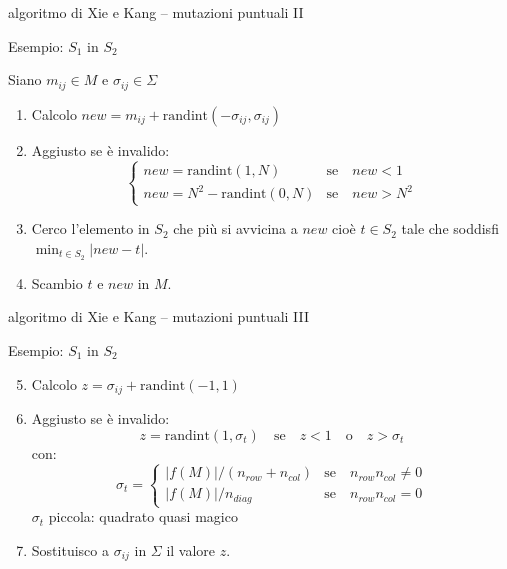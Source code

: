 \documentclass[10pt]{beamer}
\begin{document}
\begin{frame}{algoritmo di Xie e Kang -- mutazioni puntuali II}

    \begin{block}{Esempio: $ S_1 $ in $ S_2 $ }
    	\parbox{0.98\columnwidth}{
    		Siano $ m_{ij} \in M $ e $ \sigma_{ij} \in \Sigma $
    		\begin{enumerate}
    			\item Calcolo $ new =  m_{ij}   + \text{randint}(-\sigma_{ij}, \sigma_{ij})  $
    			\item Aggiusto se è invalido:
    			\[
    			\begin{cases}
    			new = \text{randint}(1,N) & \text{se} \quad new < 1  \\
    			new = N^2 - \text{randint}(0,N) & \text{se} \quad new > N^2  
    			\end{cases}
    			\]
    			\item Cerco l'elemento in $ S_2 $ che più si avvicina a $ new $ cioè $ t \in  S_2  $ tale che soddisfi $ \min_{t \in S_2} \lvert new - t \rvert $.
    			\item Scambio $ t $ e $ new $ in $ M $.	
    		\end{enumerate}
    	}
    \end{block} 
\end{frame}

\begin{frame}{algoritmo di Xie e Kang -- mutazioni puntuali III}
	
	\begin{block}{Esempio: $ S_1 $ in $ S_2 $ }
		\parbox{0.98\columnwidth}{
			\begin{enumerate}
				\setcounter{enumi}{4}
				\item Calcolo $ z =  \sigma_{ij}   + \text{randint}(-1,1)  $
				\item Aggiusto se è invalido:
\[
z = \text{randint}(1,\sigma_t) \quad \text{se} \quad z < 1 \quad \text{o} \quad  z > \sigma_t 
\]
				con:
				\[ \sigma_t = 
				\begin{cases}
				\lvert f(M) \rvert \slash \left(n_{row} + n_{col}\right) & \text{se} \quad n_{row}n_{col} \not = 0  \\
				\lvert f(M) \rvert \slash n_{diag} & \text{se} \quad n_{row}n_{col} = 0 
				\end{cases}
				\]
				$ \sigma_t $ piccola: quadrato quasi magico
				\item Sostituisco a $ \sigma_{ij} $ in $ \Sigma $ il valore $ z $.
			\end{enumerate}
		}
	\end{block} 
	
\end{frame}
\end{document}
